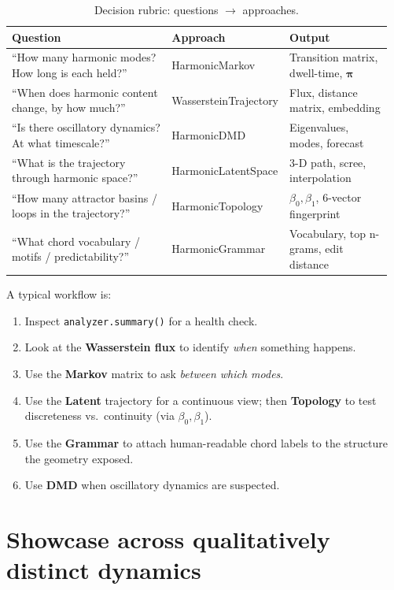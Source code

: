 \documentclass[11pt,a4paper]{article}
\begin{document}
\begin{table}[H]
\centering
\small
\begin{tabular}{@{}p{0.42\linewidth}p{0.27\linewidth}p{0.27\linewidth}@{}}
\toprule
\textbf{Question} & \textbf{Approach} & \textbf{Output} \\
\midrule
``How many harmonic modes? How long is each held?''
  & HarmonicMarkov     & Transition matrix, dwell-time, $\boldsymbol\pi$ \\
``When does harmonic content change, by how much?''
  & WassersteinTrajectory & Flux, distance matrix, embedding \\
``Is there oscillatory dynamics? At what timescale?''
  & HarmonicDMD        & Eigenvalues, modes, forecast \\
``What is the trajectory through harmonic space?''
  & HarmonicLatentSpace & 3-D path, scree, interpolation \\
``How many attractor basins / loops in the trajectory?''
  & HarmonicTopology    & $\beta_0, \beta_1$, 6-vector fingerprint \\
``What chord vocabulary / motifs / predictability?''
  & HarmonicGrammar     & Vocabulary, top n-grams, edit distance \\
\bottomrule
\end{tabular}
\caption{Decision rubric: questions $\to$ approaches.}
\end{table}

A typical workflow is:
\begin{enumerate}[nosep,leftmargin=*]
  \item Inspect \texttt{analyzer.summary()} for a health check.
  \item Look at the \textbf{Wasserstein flux} to identify \emph{when}
        something happens.
  \item Use the \textbf{Markov} matrix to ask \emph{between which modes}.
  \item Use the \textbf{Latent} trajectory for a continuous view; then
        \textbf{Topology} to test discreteness vs.\ continuity (via
        $\beta_0, \beta_1$).
  \item Use the \textbf{Grammar} to attach human-readable chord labels
        to the structure the geometry exposed.
  \item Use \textbf{DMD} when oscillatory dynamics are suspected.
\end{enumerate}

\part{Showcase across qualitatively distinct dynamics}
\end{document}
